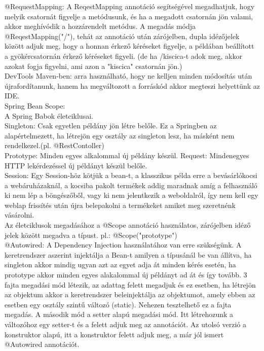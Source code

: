\documentclass[11pt]{article}
\begin{document}
@RequestMapping: A ReqestMapping annotáció segítségével megadhatjuk, hogy melyik csatornát figyelje a metódusunk, és ha a megadott csatornán jön valami, akkor meghívódik a hozzárendelt metódus.  A megadás módja @ReqestMapping("/"), tehát az annotáció után zárójelben, dupla idézőjelek között adjuk meg, hogy a honnan érkező kéréseket figyelje, a példában beállított a gyökércsatornán érkező kéréseket figyeli. (de ha /kiscica-t adok meg, akkor azokat fogja figyelni, ami azon a "kiscica" csatornán jön.)\\

DevTools Maven-ben: arra használható, hogy ne kelljen minden módosítás után újrafordítanunk, hanem ha megváltozott a forráskód akkor megteszi helyettünk az IDE.\\

Spring Bean Scope:\\
A Spring Babok életciklusai.\\
Singleton: Csak egyetlen példány jön létre belőle. Ez a Springben az alapértelmezett, ha létrejön egy osztály az singleton lesz, ha másként nem rendelkezel.(pl. @RestContoller)\\
Prototype: Minden egyes alkalommal új példány készül.
Request: Mindenegyes HTTP lekérdezéssel új példányt készül belőle.\\
Session: Egy Session-höz kötjük a bean-t, a klasszikus példa erre a bevásárlókocsi a webáruházaknál, a kocsiba pakolt termékek addig maradnak amíg a felhasználó ki nem lép a böngészőből, vagy ki nem jelentkezik a weboldalról, így nem kell egy weblap frissítés után újra belepakolni a termékeket amiket meg szeretnénk vásárolni.\\
Az életciklusok megadásához a @Scope annotáció használatos, zárójelben idéző jelek között megadva a típust. pl.: @Scope("prototype")\\

@Autowired: A Dependency Injection használatához van erre szükségünk. A keretrendszer aszerint injektálja a Bean-t amilyen a típusánál be van állítva, ha singleton akkor mindig ugyan azt az egyet adja át minden kérés esetén, ha prototype akkor minden egyes alakalommal új példányt ad át és így tovább.
3 fajta megadási mód létezik, az adattag felett megadjuk és ez esetben, ha létrejön az objektum akkor a keretrendszer beleinjektálja az objektumot, amely ebben az esetben egy osztály szintű változó (static). Nehezen tesztelhető ez a fajta megadás. A második mód a setter alapú megadási mód. Itt létrehozunk a változóhoz egy setter-t és a felett adjuk meg az annotációt. Az utolsó verzió a konstruktor alapú, itt a konstruktor felett adjuk meg, a már jól ismert @Autowired annotációt.
\end{document}
